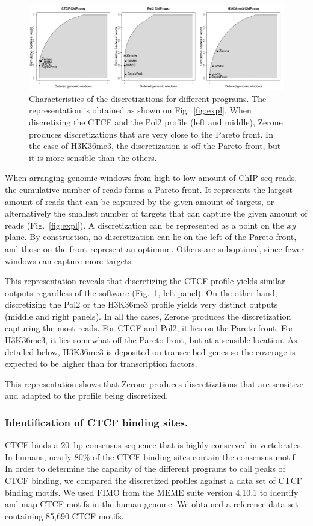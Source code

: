 \documentclass{bioinfo}
\begin{document}
\begin{figure}
\centerline{\includegraphics[scale=0.4]{pareto_front.pdf}}
\caption{
  Characteristics of the discretizations for different programs.
  The representation is obtained as shown on Fig.~\ref{fig:expl}.
  When discretizing the CTCF and the Pol2 profile (left and middle),
  Zerone produces discretizations that are very close to the Pareto
  front. In the case of H3K36me3, the discretization is off the
  Pareto front, but it is more sensible than the others.
}
\label{fig:pareto}
\end{figure}

When arranging genomic windows from high to low amount of ChIP-seq
reads, the cumulative number of reads forms a Pareto front.
It represents the largest amount of reads that can be captured by the
given amount of targets, or alternatively the smallest number of
targets that can capture the given amount of reads
(Fig.~\ref{fig:expl}). A discretization can be represented as a point
on the $xy$ plane.  By construction, no discretization can lie on the
left of the Pareto front, and those on the front represent an
optimum. Others are suboptimal, since fewer windows can capture more
targets.


This representation reveals that discretizing the CTCF profile yields
similar outputs regardless of the software (Fig.~\ref{fig:pareto},
left panel). On the other hand, discretizing the Pol2 or the H3K36me3
profile yields very distinct outputs (middle and right panels). In
all the cases, Zerone produces the discretization capturing the most
reads. For CTCF and Pol2, it lies on the Pareto front. For H3K36me3,
it lies somewhat off the Pareto front, but at a sensible location.
As detailed below, H3K36me3 is deposited on transcribed genes
\citep{pmid16122420,pmid23739122} so the coverage is expected to
be higher than for transcription factors.

This representation shows that Zerone produces discretizations that
are sensitive and adapted to the profile being discretized.

\subsubsection{Identification of CTCF binding sites.}
CTCF binds a 20~bp consensus sequence that is highly conserved in
vertebrates. In humans, nearly 80\% of the CTCF binding
sites contain the consensus motif \citep{pmid17382889}. In order to
determine the capacity of the different programs to call peaks of CTCF
binding, we compared the discretized profiles against a data set of CTCF
binding motifs. We used FIMO \citep{pmid21330290} from the MEME suite
version 4.10.1 \citep{pmid19458158} to identify and map CTCF motifs in
the human genome. We obtained a reference data set containing 85,690
CTCF motifs.
\end{document}
